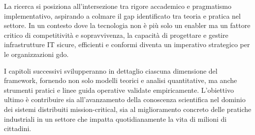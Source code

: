 La ricerca si posiziona all'intersezione tra rigore accademico e pragmatismo implementativo, aspirando a colmare il gap identificato tra teoria e pratica nel settore. In un contesto dove la tecnologia non è più solo un enabler ma un fattore critico di competitività e sopravvivenza, la capacità di progettare e gestire infrastrutture IT sicure, efficienti e conformi diventa un imperativo strategico per le organizzazioni \gls{gdo}.

I capitoli successivi svilupperanno in dettaglio ciascuna dimensione del framework, fornendo non solo modelli teorici e analisi quantitative, ma anche strumenti pratici e linee guida operative validate empiricamente. L'obiettivo ultimo è contribuire sia all'avanzamento della conoscenza scientifica nel dominio dei sistemi distribuiti mission-critical, sia al miglioramento concreto delle pratiche industriali in un settore che impatta quotidianamente la vita di milioni di cittadini.

\clearpage
\printbibliography[
    heading=subbibliography,
    title={Riferimenti Bibliografici del Capitolo 1},
]

\endrefsection
